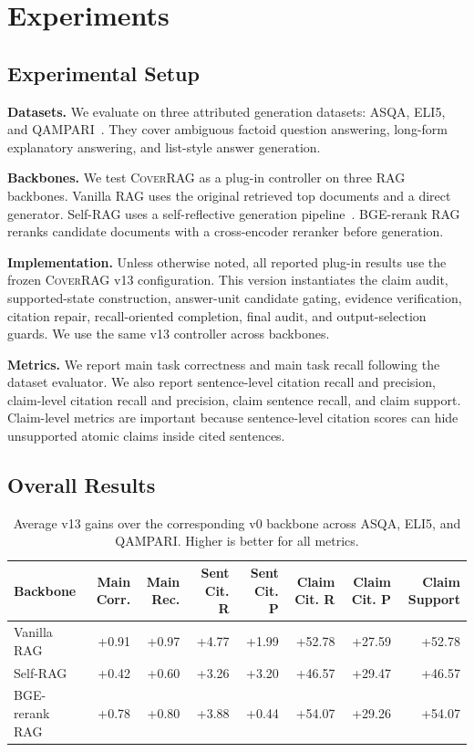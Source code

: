 \section{Experiments}
\label{sec:experiments}

\subsection{Experimental Setup}

\textbf{Datasets.} We evaluate on three attributed generation datasets: ASQA, ELI5, and QAMPARI~\cite{gao2023enabling}. They cover ambiguous factoid question answering, long-form explanatory answering, and list-style answer generation.

\textbf{Backbones.} We test \textsc{CoverRAG} as a plug-in controller on three RAG backbones. Vanilla RAG uses the original retrieved top documents and a direct generator. Self-RAG uses a self-reflective generation pipeline~\cite{asai2024self}. BGE-rerank RAG reranks candidate documents with a cross-encoder reranker before generation.

\textbf{Implementation.} Unless otherwise noted, all reported plug-in results use the frozen \textsc{CoverRAG} v13 configuration. This version instantiates the claim audit, supported-state construction, answer-unit candidate gating, evidence verification, citation repair, recall-oriented completion, final audit, and output-selection guards. We use the same v13 controller across backbones.

\textbf{Metrics.} We report main task correctness and main task recall following the dataset evaluator. We also report sentence-level citation recall and precision, claim-level citation recall and precision, claim sentence recall, and claim support. Claim-level metrics are important because sentence-level citation scores can hide unsupported atomic claims inside cited sentences.

\subsection{Overall Results}

\begin{table}[t]
    \centering
    \caption{Average v13 gains over the corresponding v0 backbone across ASQA, ELI5, and QAMPARI. Higher is better for all metrics.}
    \label{tab:avg_results}
    \scriptsize
    \setlength{\tabcolsep}{3pt}
    \begin{tabular}{lrrrrrrr}
        \toprule
        Backbone & Main Corr. & Main Rec. & Sent Cit. R & Sent Cit. P & Claim Cit. R & Claim Cit. P & Claim Support \\
        \midrule
        Vanilla RAG & +0.91 & +0.97 & +4.77 & +1.99 & +52.78 & +27.59 & +52.78 \\
        Self-RAG & +0.42 & +0.60 & +3.26 & +3.20 & +46.57 & +29.47 & +46.57 \\
        BGE-rerank RAG & +0.78 & +0.80 & +3.88 & +0.44 & +54.07 & +29.26 & +54.07 \\
        \bottomrule
    \end{tabular}
\end{table}

